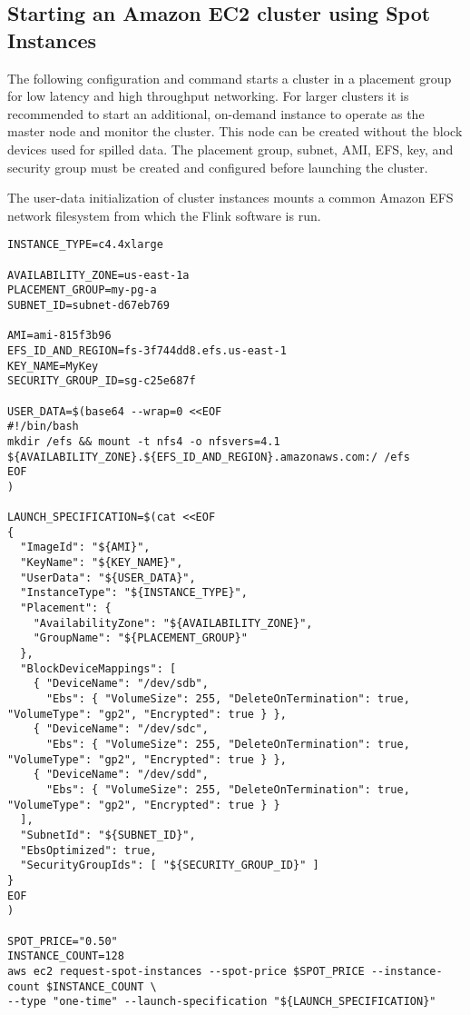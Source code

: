 \documentclass{article}
\begin{document}
\subsection{Starting an Amazon EC2 cluster using Spot Instances}

The following configuration and command starts a cluster in a placement group for low latency and high throughput networking. For larger clusters it is recommended to start an additional, on-demand instance to operate as the master node and monitor the cluster. This node can be created without the block devices used for spilled data. The placement group, subnet, AMI, EFS, key, and security group must be created and configured before launching the cluster.

The user-data initialization of cluster instances mounts a common Amazon EFS network filesystem from which the Flink software is run.

\begin{adjustwidth}{-1.5in}{-1.5in}
\begin{verbatim}
INSTANCE_TYPE=c4.4xlarge

AVAILABILITY_ZONE=us-east-1a
PLACEMENT_GROUP=my-pg-a
SUBNET_ID=subnet-d67eb769

AMI=ami-815f3b96
EFS_ID_AND_REGION=fs-3f744dd8.efs.us-east-1
KEY_NAME=MyKey
SECURITY_GROUP_ID=sg-c25e687f

USER_DATA=$(base64 --wrap=0 <<EOF
#!/bin/bash
mkdir /efs && mount -t nfs4 -o nfsvers=4.1 ${AVAILABILITY_ZONE}.${EFS_ID_AND_REGION}.amazonaws.com:/ /efs
EOF
)

LAUNCH_SPECIFICATION=$(cat <<EOF
{
  "ImageId": "${AMI}",
  "KeyName": "${KEY_NAME}",
  "UserData": "${USER_DATA}",
  "InstanceType": "${INSTANCE_TYPE}",
  "Placement": {
    "AvailabilityZone": "${AVAILABILITY_ZONE}",
    "GroupName": "${PLACEMENT_GROUP}"
  },
  "BlockDeviceMappings": [
    { "DeviceName": "/dev/sdb",
      "Ebs": { "VolumeSize": 255, "DeleteOnTermination": true, "VolumeType": "gp2", "Encrypted": true } },
    { "DeviceName": "/dev/sdc",
      "Ebs": { "VolumeSize": 255, "DeleteOnTermination": true, "VolumeType": "gp2", "Encrypted": true } },
    { "DeviceName": "/dev/sdd",
      "Ebs": { "VolumeSize": 255, "DeleteOnTermination": true, "VolumeType": "gp2", "Encrypted": true } }
  ],
  "SubnetId": "${SUBNET_ID}",
  "EbsOptimized": true,
  "SecurityGroupIds": [ "${SECURITY_GROUP_ID}" ]
}
EOF
)

SPOT_PRICE="0.50"
INSTANCE_COUNT=128
aws ec2 request-spot-instances --spot-price $SPOT_PRICE --instance-count $INSTANCE_COUNT \
--type "one-time" --launch-specification "${LAUNCH_SPECIFICATION}"
\end{verbatim}
\end{adjustwidth}
\end{document}
